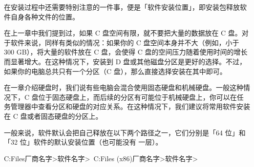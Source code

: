 在安装过程中还需要特别注意的一件事，便是「软件安装位置」，即安装包释放软件自身各种文件的位置。

在上一章中我们提到过，如果 C 盘空间有限，就不要把大量的数据放在 C 盘。对于软件来说，同样有类似的情况：如果你的 C 盘空间本身并不大（例如，小于 300 GB），将大量的软件放在 C 盘，会使得 C 盘的空间压力随着使用时间的增长而显著增大。在这种情况下，安装到 D 盘或其他磁盘分区是更好的选择。不过，如果你的电脑总共只有一个分区（C 盘），那么直接选择安装在其中即可。

\begin{note}
  在一章介绍硬盘时，我们说有些电脑会混合使用固态硬盘和机械硬盘。一般这种情况下，C 盘位于固态硬盘上，而后续的分区有可能位于机械硬盘上，你可以在任务管理器中查看分区和硬盘的对应关系。在这种情况下，我们建议将常用软件安装在 C 盘或者固态硬盘的分区上。
\end{note}

一般来说，软件默认会把自己释放在以下两个路径之一，它们分别是「64 位」和「32 位」软件的默认安装位置（也可能没有  一层）。

\begin{MissingVerbatim}
C:\Program Files\<厂商名字>\<软件名字>\
C:\Program Files (x86)\<厂商名字>\<软件名字>\
\end{MissingVerbatim}

